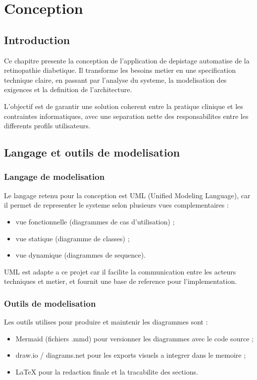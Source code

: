 
\chapter{Conception}
\label{chap:conception}

\section{Introduction}
Ce chapitre presente la conception de l'application de depistage automatise de la retinopathie diabetique.
Il transforme les besoins metier en une specification technique claire, en passant par l'analyse du systeme,
la modelisation des exigences et la definition de l'architecture.

L'objectif est de garantir une solution coherent entre la pratique clinique et les contraintes informatiques,
avec une separation nette des responsabilites entre les differents profils utilisateurs.

\section{Langage et outils de modelisation}

\subsection{Langage de modelisation}
Le langage retenu pour la conception est UML (Unified Modeling Language), car il permet de representer
le systeme selon plusieurs vues complementaires :
\begin{itemize}
    \item vue fonctionnelle (diagrammes de cas d'utilisation) ;
    \item vue statique (diagramme de classes) ;
    \item vue dynamique (diagrammes de sequence).
\end{itemize}

UML est adapte a ce projet car il facilite la communication entre les acteurs techniques et metier,
et fournit une base de reference pour l'implementation.

\subsection{Outils de modelisation}
Les outils utilises pour produire et maintenir les diagrammes sont :
\begin{itemize}
    \item Mermaid (fichiers .mmd) pour versionner les diagrammes avec le code source ;
    \item draw.io / diagrams.net pour les exports visuels a integrer dans le memoire ;
    \item LaTeX pour la redaction finale et la tracabilite des sections.
\end{itemize}

